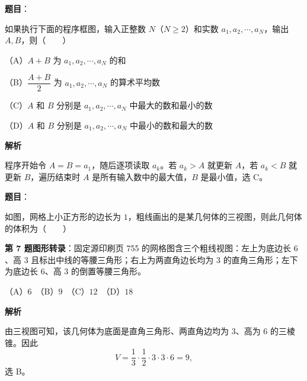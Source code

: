 \begin{answer}

\textbf{题目}：

如果执行下面的程序框图，输入正整数 $N$（$N\geqslant2$）和实数 $a_1,a_2,\cdots,a_N$，输出 $A,B$，则\mbox{（　　）}
\nopagebreak[4]
\begin{center}\end{center}
\nopagebreak[4]
（A）$A+B$ 为 $a_1,a_2,\cdots,a_N$ 的和

（B）$\dfrac{A+B}{2}$ 为 $a_1,a_2,\cdots,a_N$ 的算术平均数

（C）$A$ 和 $B$ 分别是 $a_1,a_2,\cdots,a_N$ 中最大的数和最小的数

（D）$A$ 和 $B$ 分别是 $a_1,a_2,\cdots,a_N$ 中最小的数和最大的数

\textbf{解析}

程序开始令 $A=B=a_1$，随后逐项读取 $a_k$。若 $a_k>A$ 就更新 $A$，若 $a_k<B$ 就更新 $B$，遍历结束时 $A$ 是所有输入数中的最大值，$B$ 是最小值，选 C。


\end{answer}
\begin{answer}

\textbf{题目}：

如图，网格上小正方形的边长为 $1$，粗线画出的是某几何体的三视图，则此几何体的体积为\mbox{（　　）}
\nopagebreak[4]
\begin{center}\end{center}
\nopagebreak[4]
\begin{gktip}
\textbf{第 7 题图形转录}：固定源印刷页 755 的网格图含三个粗线视图：左上为底边长 $6$、高 $3$ 且标出中线的等腰三角形；右上为两直角边长均为 $3$ 的直角三角形；左下为底边长 $6$、高 $3$ 的倒置等腰三角形。
\end{gktip}

（A）$6$　（B）$9$　（C）$12$　（D）$18$

\textbf{解析}

由三视图可知，该几何体为底面是直角三角形、两直角边均为 $3$、高为 $6$ 的三棱锥。因此
\nopagebreak[4]
\[
V=\frac13\cdot\frac12\cdot3\cdot3\cdot6=9,
\]
选 B。


\end{answer}
